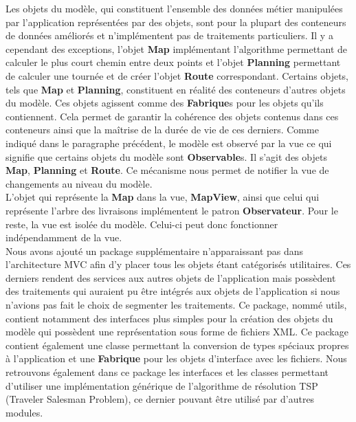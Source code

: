 \documentclass[paper=a4, fontsize=11pt]{report}
\numberwithin{equation}{section}		%
\numberwithin{figure}{section}		%
\numberwithin{table}{section}		%
\renewcommand{\bf}[1]{\textbf{#1}}
\begin{document}
Les objets du modèle, qui constituent l'ensemble des données métier manipulées par l'application représentées par des objets, sont pour la plupart des conteneurs de données améliorés et n'implémentent pas de traitements particuliers. Il y a cependant des exceptions, l'objet \bf{Map} implémentant l'algorithme permettant de calculer le plus court chemin entre deux points et l'objet \bf{Planning} permettant de calculer une tournée et de créer l'objet \bf{Route} correspondant. Certains objets, tels que \bf{Map} et \bf{Planning}, constituent en réalité des conteneurs d'autres objets du modèle. Ces objets agissent comme des \bf{Fabrique}s pour les objets qu'ils contiennent. Cela permet de garantir la cohérence des objets contenus dans ces conteneurs ainsi que la maîtrise de la durée de vie de ces derniers. Comme indiqué dans le paragraphe précédent, le modèle est observé par la vue ce qui signifie que certains objets du modèle sont \bf{Observable}s. Il s'agit des objets \bf{Map}, \bf{Planning} et \bf{Route}. Ce mécanisme nous permet de notifier la vue de changements au niveau du modèle. \\

L'objet qui représente la \bf{Map} dans la vue, \bf{MapView}, ainsi que celui qui représente l'arbre des livraisons implémentent le patron \bf{Observateur}. Pour le reste, la vue est isolée du modèle. Celui-ci peut donc fonctionner indépendamment de la vue. \\

Nous avons ajouté un package supplémentaire n'apparaissant pas dans l'architecture MVC afin d'y placer tous les objets étant catégorisés utilitaires. Ces  derniers rendent des services aux autres objets de l'application mais possèdent des traitements qui auraient pu être intégrés aux objets de l'application si nous n'avions pas fait le choix de segmenter les traitements. Ce package, nommé utils, contient notamment des interfaces plus simples pour la création des objets du modèle qui possèdent une représentation sous forme de fichiers XML. Ce package contient également une classe permettant la conversion de types spéciaux propres à l'application et une \bf{Fabrique} pour les objets d'interface avec les fichiers. Nous retrouvons également dans ce package les interfaces et les classes permettant d'utiliser une implémentation générique de l'algorithme de résolution TSP (Traveler Salesman Problem), ce dernier pouvant être utilisé par d'autres modules. \\
\end{document}
